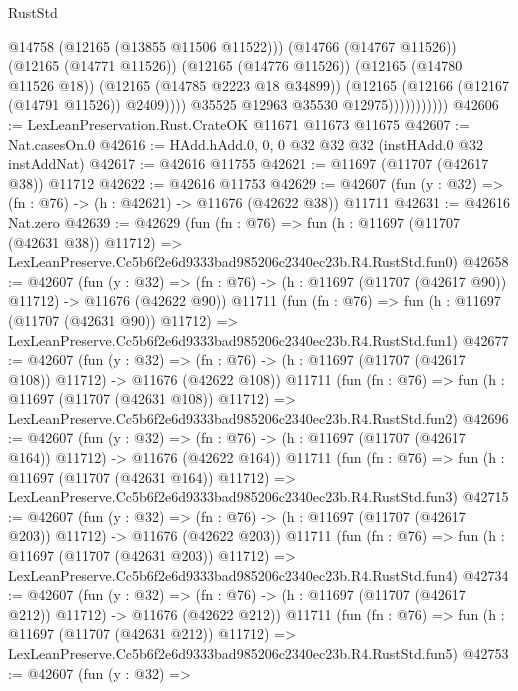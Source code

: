 \begin{lexlean}{RustStd}
\begin{coremodule}
                                @14758
                                (@12165 (@13855 @11506 @11522)))
                              (@14766 (@14767 @11526))
                              (@12165 (@14771 @11526))
                              (@12165 (@14776 @11526))
                              (@12165 (@14780 @11526 @18))
                              (@12165 (@14785 @2223 @18 @34899))
                              (@12165 (@12166 (@12167 (@14791 @11526)) @2409))))
                          @35525
                          @12963
                          @35530
                          @12975)))))))))))
@42606 := LexLeanPreservation.Rust.CrateOK @11671 @11673 @11675
@42607 := Nat.casesOn.{0}
@42616 := HAdd.hAdd.{0, 0, 0} @32 @32 @32 (instHAdd.{0} @32 instAddNat)
@42617 := @42616 @11755
@42621 := @11697 (@11707 (@42617 @38)) @11712
@42622 := @42616 @11753
@42629 := @42607 (fun (y : @32) => (fn : @76) -> (h : @42621) -> @11676 (@42622 @38)) @11711
@42631 := @42616 Nat.zero
@42639 := @42629
    (fun (fn : @76) =>
    fun (h : @11697 (@11707 (@42631 @38)) @11712) =>
    LexLeanPreserve.Cc5b6f2e6d9333bad985206c2340ec23b.R4.RustStd.fun0)
@42658 := @42607
    (fun (y : @32) =>
    (fn : @76) -> (h : @11697 (@11707 (@42617 @90)) @11712) -> @11676 (@42622 @90))
    @11711
    (fun (fn : @76) =>
    fun (h : @11697 (@11707 (@42631 @90)) @11712) =>
    LexLeanPreserve.Cc5b6f2e6d9333bad985206c2340ec23b.R4.RustStd.fun1)
@42677 := @42607
    (fun (y : @32) =>
    (fn : @76) -> (h : @11697 (@11707 (@42617 @108)) @11712) -> @11676 (@42622 @108))
    @11711
    (fun (fn : @76) =>
    fun (h : @11697 (@11707 (@42631 @108)) @11712) =>
    LexLeanPreserve.Cc5b6f2e6d9333bad985206c2340ec23b.R4.RustStd.fun2)
@42696 := @42607
    (fun (y : @32) =>
    (fn : @76) -> (h : @11697 (@11707 (@42617 @164)) @11712) -> @11676 (@42622 @164))
    @11711
    (fun (fn : @76) =>
    fun (h : @11697 (@11707 (@42631 @164)) @11712) =>
    LexLeanPreserve.Cc5b6f2e6d9333bad985206c2340ec23b.R4.RustStd.fun3)
@42715 := @42607
    (fun (y : @32) =>
    (fn : @76) -> (h : @11697 (@11707 (@42617 @203)) @11712) -> @11676 (@42622 @203))
    @11711
    (fun (fn : @76) =>
    fun (h : @11697 (@11707 (@42631 @203)) @11712) =>
    LexLeanPreserve.Cc5b6f2e6d9333bad985206c2340ec23b.R4.RustStd.fun4)
@42734 := @42607
    (fun (y : @32) =>
    (fn : @76) -> (h : @11697 (@11707 (@42617 @212)) @11712) -> @11676 (@42622 @212))
    @11711
    (fun (fn : @76) =>
    fun (h : @11697 (@11707 (@42631 @212)) @11712) =>
    LexLeanPreserve.Cc5b6f2e6d9333bad985206c2340ec23b.R4.RustStd.fun5)
@42753 := @42607
    (fun (y : @32) =>

\end{coremodule}
\end{lexlean}
